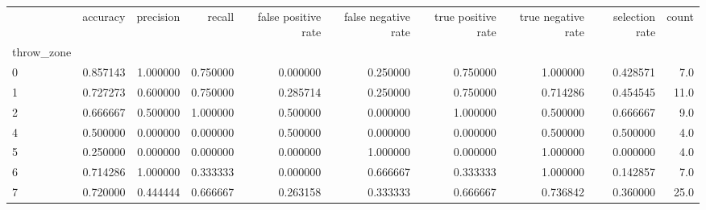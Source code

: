 \begin{tabular}{lrrrrrrrrr}
\toprule
{} &  accuracy &  precision &    recall &  false positive rate &  false negative rate &  true positive rate &  true negative rate &  selection rate &  count \\
throw\_zone &           &            &           &                      &                      &                     &                     &                 &        \\
\midrule
0          &  0.857143 &   1.000000 &  0.750000 &             0.000000 &             0.250000 &            0.750000 &            1.000000 &        0.428571 &    7.0 \\
1          &  0.727273 &   0.600000 &  0.750000 &             0.285714 &             0.250000 &            0.750000 &            0.714286 &        0.454545 &   11.0 \\
2          &  0.666667 &   0.500000 &  1.000000 &             0.500000 &             0.000000 &            1.000000 &            0.500000 &        0.666667 &    9.0 \\
4          &  0.500000 &   0.000000 &  0.000000 &             0.500000 &             0.000000 &            0.000000 &            0.500000 &        0.500000 &    4.0 \\
5          &  0.250000 &   0.000000 &  0.000000 &             0.000000 &             1.000000 &            0.000000 &            1.000000 &        0.000000 &    4.0 \\
6          &  0.714286 &   1.000000 &  0.333333 &             0.000000 &             0.666667 &            0.333333 &            1.000000 &        0.142857 &    7.0 \\
7          &  0.720000 &   0.444444 &  0.666667 &             0.263158 &             0.333333 &            0.666667 &            0.736842 &        0.360000 &   25.0 \\
\bottomrule
\end{tabular}
